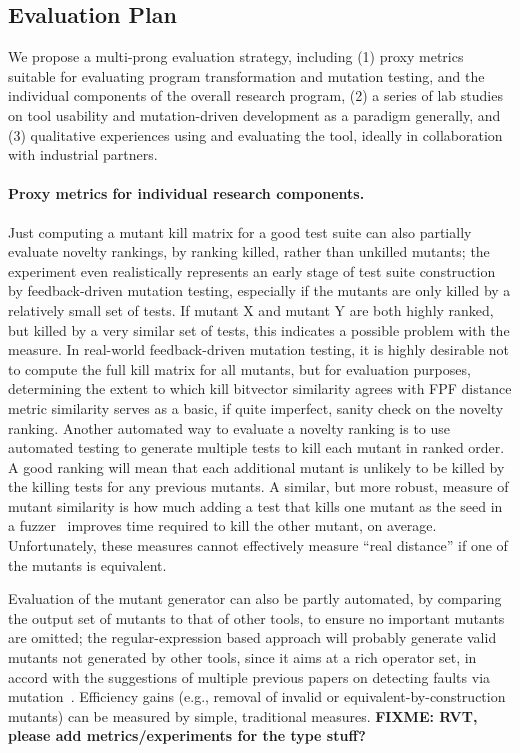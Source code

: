 
\subsection{Evaluation Plan}
\label{sec:evalplan}

We propose a multi-prong evaluation strategy, including (1) proxy metrics
suitable for evaluating program transformation and mutation testing, and the
individual components of the overall research program, (2) a series of lab
studies on tool usability and mutation-driven development as a paradigm
generally, and (3) qualitative experiences using and evaluating the tool,
ideally in collaboration with industrial partners.

\paragraph{Proxy metrics for individual research components.}
Just computing a mutant kill matrix for a good test suite can also
partially evaluate novelty rankings, by ranking
killed, rather than unkilled mutants; the experiment even
realistically represents an early stage of test suite construction by
feedback-driven mutation testing, especially if the mutants are only
killed by a relatively small set of tests.  If
mutant X and mutant Y are both highly ranked, but killed by a very
similar set of tests, this indicates a possible problem with the
measure.  In real-world feedback-driven mutation testing, it is highly
desirable not to compute the full kill matrix for all mutants, but
for evaluation purposes, determining the extent to which kill
bitvector similarity agrees with FPF distance metric similarity serves
as a basic, if quite imperfect, sanity check on the novelty ranking.
Another automated way to evaluate a novelty ranking is to use automated
testing to generate multiple tests to kill each mutant in ranked order.  A good ranking will mean
that each additional mutant is unlikely to be killed by the killing
tests for any previous mutants.  A similar, but more robust, measure of mutant similarity
is how much adding a test that kills one mutant as the seed in a
fuzzer~\cite{aflfuzz,libfuzzer} improves time required to kill the other
mutant, on average.  Unfortunately, these measures cannot effectively
measure ``real distance'' if one of the mutants is equivalent.

Evaluation of the mutant generator can also be partly automated, by
comparing the output set of mutants to that of other tools, to ensure
no important mutants are omitted; the regular-expression based
approach will probably generate valid mutants not generated by other
tools, since it aims at a rich operator set, in accord with the
suggestions of multiple previous papers on detecting faults via
mutation~\cite{just2014mutants,gopinath2017mutation}.  Efficiency
gains (e.g., removal of invalid or equivalent-by-construction mutants) can
be measured by simple, traditional measures.
\textbf{FIXME: RVT, please add metrics/experiments for the type stuff?}

